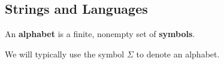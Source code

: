 


















\subsection{Strings and Languages}

\begin{definition} An \textbf{alphabet} is a finite, nonempty set of
\textbf{symbols}. \end{definition}

\begin{notation} We will typically use the symbol $\Sigma$ to denote an
alphabet. \end{notation}

